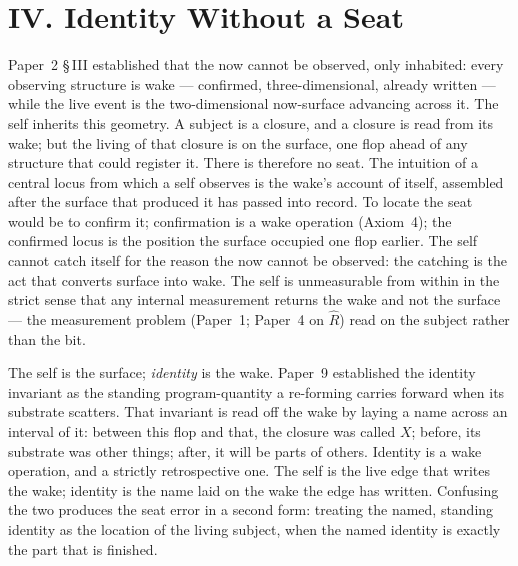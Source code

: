 \documentclass[11pt,oneside]{report}
\theoremstyle{definition}
\theoremstyle{remark}
\begin{document}
\section*{IV. Identity Without a Seat}

Paper~2 \S\,III established that the now cannot be observed, only inhabited: every observing structure is wake --- confirmed, three-dimensional, already written --- while the live event is the two-dimensional now-surface advancing across it. The self inherits this geometry. A subject is a closure, and a closure is read from its wake; but the living of that closure is on the surface, one flop ahead of any structure that could register it. There is therefore no seat. The intuition of a central locus from which a self observes is the wake's account of itself, assembled after the surface that produced it has passed into record. To locate the seat would be to confirm it; confirmation is a wake operation (Axiom~4); the confirmed locus is the position the surface occupied one flop earlier. The self cannot catch itself for the reason the now cannot be observed: the catching is the act that converts surface into wake. The self is unmeasurable from within in the strict sense that any internal measurement returns the wake and not the surface --- the measurement problem (Paper~1; Paper~4 on \ensuremath{\hat{R}}) read on the subject rather than the bit.

The self is the surface; \emph{identity} is the wake. Paper~9 established the identity invariant as the standing program-quantity a re-forming carries forward when its substrate scatters. That invariant is read off the wake by laying a name across an interval of it: between this flop and that, the closure was called \ensuremath{X}; before, its substrate was other things; after, it will be parts of others. Identity is a wake operation, and a strictly retrospective one. The self is the live edge that writes the wake; identity is the name laid on the wake the edge has written. Confusing the two produces the seat error in a second form: treating the named, standing identity as the location of the living subject, when the named identity is exactly the part that is finished.
\end{document}
